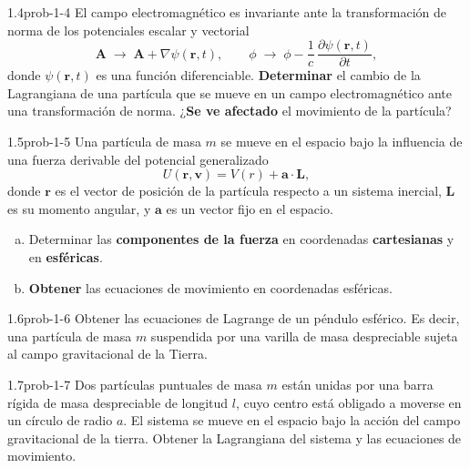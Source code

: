 \begin{problema}{1.4}{prob-1-4}
El campo electromagnético es invariante ante la transformación de norma de los potenciales escalar y vectorial
\[
\mathbf A \;\to\; \mathbf A+\nabla\psi(\mathbf r,t),\qquad
\phi \;\to\; \phi-\frac{1}{c}\,\frac{\partial \psi(\mathbf r,t)}{\partial t},
\]
donde $\psi(\mathbf r,t)$ es una función diferenciable. \textbf{Determinar} el cambio de la Lagrangiana de una partícula que se mueve en un campo electromagnético ante una transformación de norma. ¿\textbf{Se ve afectado} el movimiento de la partícula?
\end{problema}

\begin{problema}{1.5}{prob-1-5}
Una partícula de masa $m$ se mueve en el espacio bajo la influencia de una fuerza derivable del potencial generalizado
\[
U(\mathbf r,\mathbf v)=V(r)+\mathbf a\cdot\mathbf L,
\]
donde $\mathbf r$ es el vector de posición de la partícula respecto a un sistema inercial, $\mathbf L$ es su momento angular, y $\mathbf a$ es un vector fijo en el espacio.
\begin{enumerate}[(a)]
    \item Determinar las \textbf{componentes de la fuerza} en coordenadas \textbf{cartesianas} y en \textbf{esféricas}.
    \item \textbf{Obtener} las ecuaciones de movimiento en coordenadas esféricas.
\end{enumerate}
\end{problema} 

\begin{problema}{1.6}{prob-1-6}
Obtener las ecuaciones de Lagrange de un péndulo esférico. Es decir, una partícula de masa $m$ suspendida por una varilla de masa despreciable sujeta al campo gravitacional de la Tierra.
\end{problema}

\begin{problema}{1.7}{prob-1-7}
Dos partículas puntuales de masa $m$ están unidas por una barra rígida de masa despreciable de longitud $l$, cuyo centro está obligado a moverse en un círculo de radio $a$. El sistema se mueve en el espacio bajo la acción del campo gravitacional de la tierra. Obtener la Lagrangiana del sistema y las ecuaciones de movimiento.
\end{problema}

